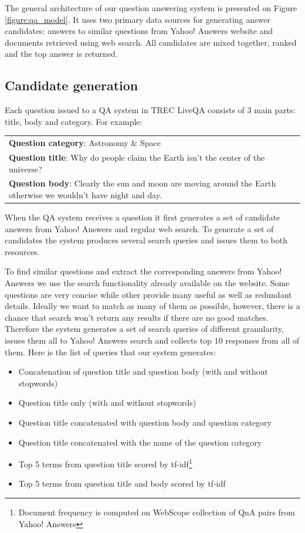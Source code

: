 \documentclass[]{article}
\begin{document}
The general architecture of our question answering system is presented on Figure \ref{figure:qa_model}.
It uses two primary data sources for generating answer candidates: answers to similar questions from Yahoo! Answers website and documents retrieved using web search. 
All candidates are mixed together, ranked and the top answer is returned.

\subsection{Candidate generation}
 
Each question issued to a QA system in TREC LiveQA consists of 3 main parts: title, body and category.
For example:

\vspace{0.3cm}
\begin{tabular}{|p{15cm}|}
\hline
\textbf{Question category}: Astronomy \& Space\\
\textbf{Question title}: Why do people claim the Earth isn't the center of the universe?\\
\textbf{Question body}: Clearly the sun and moon are moving around the Earth otherwise we wouldn't have night and day.\\
\hline
\end{tabular}
\vspace{0.3cm}

When the QA system receives a question it first generates a set of candidate answers from Yahoo! Answers and regular web search.
To generate a set of candidates the system produces several search queries and issues them to both resources.

To find similar questions and extract the corresponding answers from Yahoo! Answers we use the search functionality already available on the website.
Some questions are very concise while other provide many useful as well as redundant details.
Ideally we want to match as many of them as possible, however, there is a chance that search won't return any results if there are no good matches.
Therefore the system generates a set of search queries of different granularity, issues them all to Yahoo! Answers search and collects top 10 responses from all of them.
Here is the list of queries that our system generates:
\begin{itemize}
	\setlength\itemsep{0mm}
	\item Concatenation of question title and question body (with and without stopwords)
	\item Question title only (with and without stopwords)
	\item Question title concatenated with question body and question category
	\item Question title concatenated with the name of the question category
	\item Top 5 terms from question title scored by tf-idf\footnote{Document frequency is computed on WebScope collection of QnA pairs from Yahoo! Answers}
	\item Top 5 terms from question title and body scored by tf-idf
\end{itemize}
\end{document}

